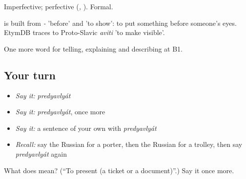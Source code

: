 Imperfective; perfective \emph{} (\emph{, }). Formal.

\begin{cousinweb}
\emph{} is built from \emph{-} 'before' and \emph{} 'to show': to put something before someone's eyes. EtymDB traces \emph{} to Proto-Slavic \emph{aviti} 'to make visible'.
\end{cousinweb}

\begin{grammarlens}[title={What you've built}]
One more word for telling, explaining and describing at B1.
\end{grammarlens}

\subsection*{Your turn}
\begin{itemize}
\raggedright
  \item \emph{Say it:} \emph{predyavlyát}
  \item \emph{Say it:} \emph{predyavlyát}, once more
  \item \emph{Say it:} a sentence of your own with \emph{predyavlyát}
  \item \emph{Recall:} say the Russian for a porter, then the Russian for a trolley, then say \emph{predyavlyát} again
\end{itemize}

\begin{tcolorbox}[breakable,colback=teal!4,colframe=teal!35!black,title={Before you move on}]
What does  mean? (\textquotedblleft{}To present (a ticket or a document)\textquotedblright{}.) Say it once more.
\end{tcolorbox}
